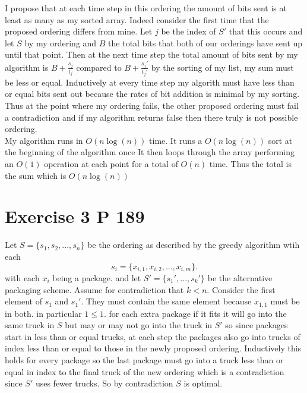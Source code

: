 \documentclass{amsart}
\begin{document}
I propose that at each time step in this ordering the amount of bits sent is at least as many as my sorted array.
Indeed consider the first time that the proposed ordering differs from mine.
Let $j$ be the index of $S'$ that this occurs and let $S$ by my ordering and $B$ the total bits that both of our orderings
have sent up until that point. Then at the next time step the total amount of bits sent by my algorithm is $B + \frac{s_j}{t_j}$
compared to $B  + \frac{s_j'}{t_j'}$ by the sorting of my list, my sum must be less or equal. Inductively at every time step my algorith must have less than or equal bits
sent out because the rates of bit addition is minimal by my sorting. Thus at the point where my ordering fails, the other proposed ordering must fail a contradiction and if my algorithm returns
false then there truly is not possible ordering.\\
My algorithm runs in $O(n\log(n))$ time. It runs a  $O(n\log(n))$ sort at the beginning of the algorithm once
It then loops through the array performing an $O(1)$ operation at each point for a total of $O(n)$ time. Thus the total is the sum which 
is  $O(n\log(n))$

\section{Exercise 3 P 189}
Let $S = \{s_1,s_2,...,s_n\}$ be the ordering as described by the greedy algorithm wtih each
\[
    s_i = \{x_{i,1},x_{i,2},...,x_{i,m}\}
.\] 
with each $x_i$ being a package.
and let $S' = \{s_1',...,s_k'\}$  be the alternative packaging scheme.
Assume for contradiction that $k < n$. Consider the first element of $s_1$ and $s_1'$. They must contain the same element
because $ x_{1,1}$ must be in both. in particular $1 \le 1$. for each extra package if it fits it will go into the same truck in $S$ but 
may or may not go into the truck in $S'$ so since packages start in less than or equal trucks, at each step the packages also go into trucks of index less than or equal to those in the newly proposed ordering.
Inductively this holds for every package so the last package must go into a truck less than or equal in index to the final truck of the new ordering which is a contradiction since $S'$ uses fewer trucks. So by contradiction
$S$ is optimal.
\end{document}
